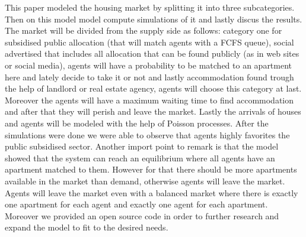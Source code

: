 This paper modeled the housing market by splitting it into three subcategories. Then on this model model compute simulations of it and lastly discus the results. The market will be divided from the supply side as follows: category one for subsidised public allocation (that will match agents with a FCFS queue), social advertised that includes all allocation that can be found publicly (as in web sites or social media), agents will have a probability to be matched to an apartment here and lately decide to take it or not and lastly accommodation found trough the help of landlord or real estate agency, agents will choose this category at last. Moreover the agents will have a maximum waiting time to find accommodation and after that they will perish and leave the market. Lastly the arrivals of houses and agents will be modeled with the help of Poisson processes. After the simulations were done we were able to observe that agents highly favorites the public subsidised sector. Another import point to remark is that the model showed that the system can reach an equilibrium where all agents have an apartment matched to them. However for that there should be more apartments available in the market than demand, otherwise agents will leave the market. Agents will leave the market even with a balanced market where there is exactly one apartment for each agent and exactly one agent for each apartment. Moreover we provided an open source code in order to further research and expand the model to fit to the desired needs.